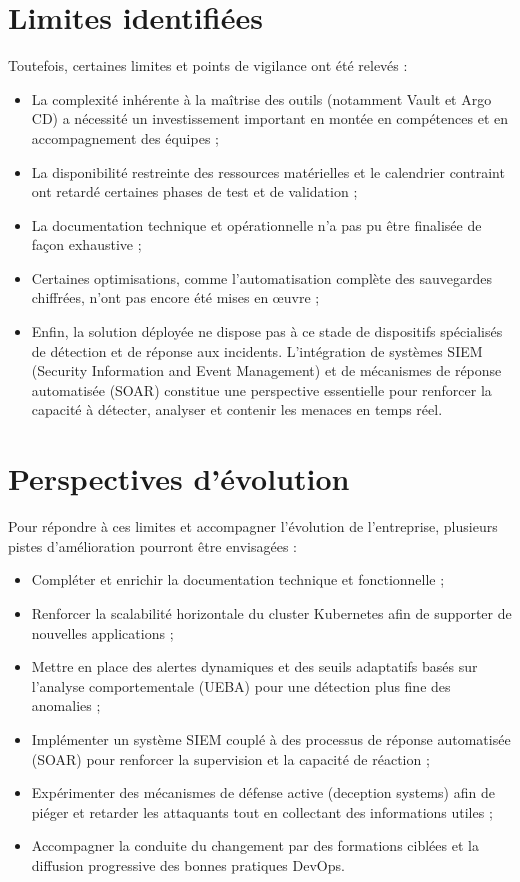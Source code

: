 \section{Limites identifiées}

Toutefois, certaines limites et points de vigilance ont été relevés :
\begin{itemize}
	\item La complexité inhérente à la maîtrise des outils (notamment Vault et Argo CD) a nécessité un investissement important en montée en compétences et en accompagnement des équipes ;
	\item La disponibilité restreinte des ressources matérielles et le calendrier contraint ont retardé certaines phases de test et de validation ;
	\item La documentation technique et opérationnelle n’a pas pu être finalisée de façon exhaustive ;
	\item Certaines optimisations, comme l’automatisation complète des sauvegardes chiffrées, n’ont pas encore été mises en œuvre ;
	\item Enfin, la solution déployée ne dispose pas à ce stade de dispositifs spécialisés de détection et de réponse aux incidents. L’intégration de systèmes SIEM (Security Information and Event Management) et de mécanismes de réponse automatisée (SOAR) constitue une perspective essentielle pour renforcer la capacité à détecter, analyser et contenir les menaces en temps réel.
\end{itemize}

\section{Perspectives d’évolution}

Pour répondre à ces limites et accompagner l’évolution de l’entreprise, plusieurs pistes d’amélioration pourront être envisagées :
\begin{itemize}
\item Compléter et enrichir la documentation technique et fonctionnelle ;
\item Renforcer la scalabilité horizontale du cluster Kubernetes afin de supporter de nouvelles applications ;
\item Mettre en place des alertes dynamiques et des seuils adaptatifs basés sur l’analyse comportementale (UEBA) pour une détection plus fine des anomalies ;
\item Implémenter un système SIEM couplé à des processus de réponse automatisée (SOAR) pour renforcer la supervision et la capacité de réaction ;
\item Expérimenter des mécanismes de défense active (deception systems) afin de piéger et retarder les attaquants tout en collectant des informations utiles ;
\item Accompagner la conduite du changement par des formations ciblées et la diffusion progressive des bonnes pratiques DevOps.
\end{itemize}

